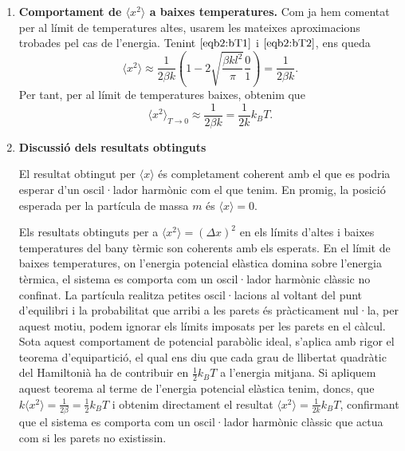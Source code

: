 \documentclass[a4paper, 10pt]{article}
\begin{document}
\begin{enumerate}
\begin{enumerate}
	\begin{equation}
		\boxed{\langle x^2 \rangle_{T\rightarrow \infty} \approx  \frac{1}{3}l^2}.
	\end{equation}
	\item \textbf{Comportament de $\langle x^2 \rangle$ a baixes temperatures.}
	Com ja hem comentat per al límit de temperatures altes, usarem les mateixes aproximacions trobades pel cas de l'energia. Tenint $\eqref{eqb2:bT1}$ i $\eqref{eqb2:bT2}$, ens queda 
	\begin{equation}
		\langle x^2 \rangle \approx  \frac{1}{2\beta k}\left( 1 - 2\sqrt{\frac{\beta k l^2}{\pi}}\frac{0}{1}\right) =  \frac{1}{2\beta k}.
	\end{equation}
	Per tant, per al límit de temperatures baixes, obtenim que
	\begin{equation}
		\boxed{\langle x^2 \rangle_{T\rightarrow 0} \approx \frac{1}{2\beta k} = \frac{1}{2k}k_BT}.
	\end{equation}
	
	\item \textbf{Discussió dels resultats obtinguts}
	
	El resultat obtingut per $\langle x \rangle$ és completament coherent amb el que es podria esperar d'un oscil·lador harmònic com el que tenim. En promig, la posició esperada per la partícula de massa $m$ és $\langle x \rangle=0$.
	
	Els resultats obtinguts per a $\langle x^2 \rangle = (\Delta x)^2$ en els límits d'altes i baixes temperatures del bany tèrmic son coherents amb els esperats. En el límit de baixes temperatures, on l'energia potencial elàstica domina sobre l'energia tèrmica, el sistema es comporta com un oscil·lador harmònic clàssic no confinat. La partícula realitza petites oscil·lacions al voltant del punt d'equilibri i la probabilitat que arribi a les parets és pràcticament nul·la, per aquest motiu, podem ignorar els límits imposats per les parets en el càlcul. Sota aquest comportament de potencial parabòlic ideal, s'aplica amb rigor el teorema d'equipartició, el qual ens diu que cada grau de llibertat quadràtic del Hamiltonià ha de contribuir en $\frac{1}{2}k_BT$ a l'energia mitjana. Si apliquem aquest teorema al terme de l'energia potencial elàstica tenim, doncs, que $k \langle x^2 \rangle = \frac{1}{2\beta} = \frac{1}{2}k_BT$ i obtenim directament el resultat $\langle x^2 \rangle = \frac{1}{2k} k_BT$, confirmant que el sistema es comporta com un oscil·lador harmònic clàssic que actua com si les parets no existissin. 
	

\end{enumerate}
\end{enumerate}
\end{document}
